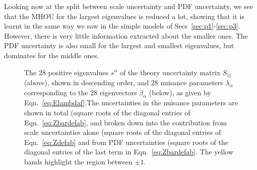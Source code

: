 Looking now at the split between scale uncertainty and PDF uncertainty, we see that the MHOU for the largest eigenvalues is reduced a lot, showing that it is learnt in the same way we saw in the simple models of Secs~\ref{sec:p1}-\ref{sec:p3}. However, there is very little information extracted about the smaller ones. The PDF uncertainty is also small for the largest and smallest eigenvalues, but dominates for the middle ones. 
  \begin{figure}[H]
    \begin{center}
    \end{center}
  \vspace{-0.55cm}
  \caption{The $28$ positive eigenvalues $s^\alpha$ of the theory uncertainty matrix $S_{ij}$ (above), shown in descending order, and 28 nuisance parameters $\lambda_\alpha$ corresponding to the $28$ eigenvectors $\beta_\alpha$ (below), as given by Eqn.~\ref{eq:Elambdaf}.The uncertainties in the nuisance parameters are shown in total (square roots of the diagonal entries of Eqn.~\ref{eq:Zbardefab}, and broken down into the contribution from scale uncertainties alone (square roots of the diagonal entries of Eqn.~\ref{eq:Zdefab}  and from PDF uncertainties (square roots of the diagonal entries of the last term in Eqn.~\ref{eq:Zbardefab}. The yellow bands highlight the region between $\pm 1$.}
  \label{fig:nuisancediag}
    \begin{center}

\end{center}
\end{figure}
